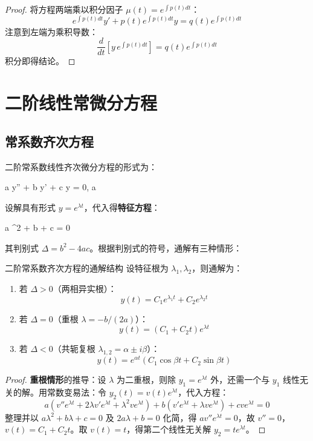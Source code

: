 \begin{proof}
	将方程两端乘以积分因子 $\mu(t) = e^{\int p(t) dt}$：
	\[
	e^{\int p(t) dt} y' + p(t) e^{\int p(t) dt} y = q(t) e^{\int p(t) dt}
	\]
	注意到左端为乘积导数：
	\[
	\frac{d}{dt}\left[ y \, e^{\int p(t) dt} \right] = q(t) e^{\int p(t) dt}
	\]
	积分即得结论。
\end{proof}

\section{二阶线性常微分方程}

\subsection{常系数齐次方程}

二阶常系数线性齐次微分方程的形式为：
\begin{myformula}
	a y'' + b y' + c y = 0, \quad a 
\end{myformula}

设解具有形式 $y = e^{\lambda t}$，代入得\textbf{特征方程}：
\begin{myformula}
	a \lambda^2 + b \lambda + c = 0
\end{myformula}

其判别式 $\Delta = b^2 - 4ac$。根据判别式的符号，通解有三种情形：

\begin{myTheorem}{二阶常系数齐次方程的通解结构}
	设特征根为 $\lambda_1, \lambda_2$，则通解为：
	\begin{enumerate}
		\item 若 $\Delta > 0$（两相异实根）：
		\[
		y(t) = C_1 e^{\lambda_1 t} + C_2 e^{\lambda_2 t}
		\]
		\item 若 $\Delta = 0$（重根 $\lambda = -b/(2a)$）：
		\[
		y(t) = (C_1 + C_2 t) e^{\lambda t}
		\]
		\item 若 $\Delta < 0$（共轭复根 $\lambda_{1,2} = \alpha \pm i\beta$）：
		\[
		y(t) = e^{\alpha t} (C_1 \cos \beta t + C_2 \sin \beta t)
		\]
	\end{enumerate}
\end{myTheorem}

\begin{proof}
	\textbf{重根情形}的推导：设 $\lambda$ 为二重根，则除 $y_1 = e^{\lambda t}$ 外，还需一个与 $y_1$ 线性无关的解。用常数变易法：令 $y_2(t) = v(t) e^{\lambda t}$，代入方程：
	\[
	a(v'' e^{\lambda t} + 2\lambda v' e^{\lambda t} + \lambda^2 v e^{\lambda t}) + b(v' e^{\lambda t} + \lambda v e^{\lambda t}) + c v e^{\lambda t} = 0
	\]
	整理并以 $a\lambda^2 + b\lambda + c = 0$ 及 $2a\lambda + b = 0$ 化简，得 $a v'' e^{\lambda t} = 0$，故 $v'' = 0$，$v(t) = C_1 + C_2 t$。取 $v(t) = t$，得第二个线性无关解 $y_2 = t e^{\lambda t}$。
\end{proof}


